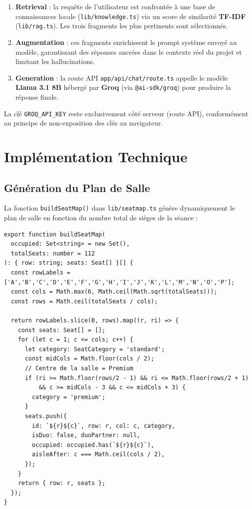 \documentclass[12pt,a4paper,openany]{report}
\begin{document}
\begin{enumerate}
  \item \textbf{Retrieval} : la requête de l'utilisateur est confrontée à une base de connaissances locale (\texttt{lib/knowledge.ts}) via un score de similarité \textbf{TF-IDF} (\texttt{lib/rag.ts}). Les trois fragments les plus pertinents sont sélectionnés.
  \item \textbf{Augmentation} : ces fragments enrichissent le prompt système envoyé au modèle, garantissant des réponses ancrées dans le contexte réel du projet et limitant les hallucinations.
  \item \textbf{Generation} : la route API \texttt{app/api/chat/route.ts} appelle le modèle \textbf{Llama 3.1 8B} hébergé par \textbf{Groq} (via \texttt{@ai-sdk/groq}) pour produire la réponse finale.
\end{enumerate}

La clé \texttt{GROQ\_API\_KEY} reste exclusivement côté serveur (route API), conformément au principe de non-exposition des clés au navigateur.

\chapter{Implémentation Technique}
\label{chap:impl}

\section{Génération du Plan de Salle}

La fonction \texttt{buildSeatMap()} dans \texttt{lib/seatmap.ts} génère dynamiquement le plan de salle en fonction du nombre total de sièges de la séance :

\begin{lstlisting}
export function buildSeatMap(
  occupied: Set<string> = new Set(),
  totalSeats: number = 112
): { row: string; seats: Seat[] }[] {
  const rowLabels = ['A','B','C','D','E','F','G','H','I','J','K','L','M','N','O','P'];
  const cols = Math.max(6, Math.ceil(Math.sqrt(totalSeats)));
  const rows = Math.ceil(totalSeats / cols);

  return rowLabels.slice(0, rows).map((r, ri) => {
    const seats: Seat[] = [];
    for (let c = 1; c <= cols; c++) {
      let category: SeatCategory = 'standard';
      const midCols = Math.floor(cols / 2);
      // Centre de la salle = Premium
      if (ri >= Math.floor(rows/2 - 1) && ri <= Math.floor(rows/2 + 1)
          && c >= midCols - 3 && c <= midCols + 3) {
        category = 'premium';
      }
      seats.push({
        id: `${r}${c}`, row: r, col: c, category,
        isDuo: false, duoPartner: null,
        occupied: occupied.has(`${r}${c}`),
        aisleAfter: c === Math.ceil(cols / 2),
      });
    }
    return { row: r, seats };
  });
}
\end{lstlisting}
\end{document}
